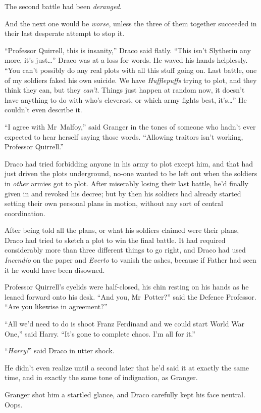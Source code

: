 The second battle had been \emph{deranged}.

And the next one would be \emph{worse}, unless the three of them together succeeded in their last desperate attempt to stop it.

“Professor Quirrell, this is insanity,” Draco said flatly.
“This isn’t Slytherin any more, it’s just…” Draco was at a loss for words. He waved his hands helplessly.
“You can’t possibly do any real plots with all this stuff going on. Last battle, one of my soldiers faked his own suicide. We have \emph{Hufflepuffs} trying to plot, and they think they can, but they \emph{can’t}. Things just happen at random now, it doesn’t have anything to do with who’s cleverest, or which army fights best, it’s…” He couldn’t even describe it.

“I agree with Mr~Malfoy,” said Granger in the tones of someone who hadn’t ever expected to hear herself saying those words.
“Allowing traitors isn’t working, Professor Quirrell.”

Draco had tried forbidding anyone in his army to plot except him, and that had just driven the plots underground, no-one wanted to be left out when the soldiers in \emph{other} armies got to plot. After miserably losing their last battle, he’d finally given in and revoked his decree; but by then his soldiers had already started setting their own personal plans in motion, without any sort of central coordination.

After being told all the plans, or what his soldiers claimed were their plans, Draco had tried to sketch a plot to win the final battle. It had required considerably more than three different things to go right, and Draco had used \emph{Incendio} on the paper and \emph{Everto} to vanish the ashes, because if Father had seen it he would have been disowned.

Professor Quirrell’s eyelids were half-closed, his chin resting on his hands as he leaned forward onto his desk.
“And you, Mr~Potter?” said the Defence Professor.
“Are you likewise in agreement?”

“All we’d need to do is shoot Franz Ferdinand and we could start World War One,” said Harry.
“It’s gone to complete chaos. I’m all for it.”

“\emph{Harry!}” said Draco in utter shock.

He didn’t even realize until a second later that he’d said it at exactly the same time, and in exactly the same tone of indignation, as Granger.

Granger shot him a startled glance, and Draco carefully kept his face neutral. Oops.

